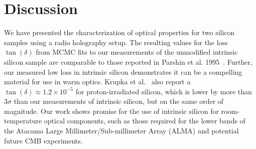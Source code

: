 \section{Discussion}
\label{sec:si_conclusion}
We have presented the characterization of optical properties for two silicon samples using a radio holography setup.  The resulting values for the loss $\tan(\delta)$ from MCMC fits to our measurements of the unmodified intrinsic silicon sample are comparable to those reported in Parshin et al. 1995~\cite{parshin}.  Further, our measured low loss in intrinsic silicon demonstrates it can be a compelling material for use in warm optics.  Krupka et al.~\cite{KRUPKA201676} also report a $\tan(\delta) \approx 1.2\times10^{-5}$ for proton-irradiated silicon, which is lower by more than $3\sigma$ than our measurements of intrinsic silicon, but on the same order of magnitude.  Our work shows promise for the use of intrinsic silicon for room-temperature optical components, such as those required for the lower bands of the Atacama Large Millimeter/Sub-millimeter Array (ALMA) and potential future CMB experiments.


